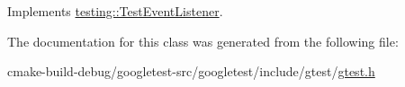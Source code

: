 Implements \mbox{\hyperlink{classtesting_1_1TestEventListener_ab4f6a0ca16ae75daf385b3b5914e1048}{testing\+::\+Test\+Event\+Listener}}.



The documentation for this class was generated from the following file\+:\begin{DoxyCompactItemize}
\item 
cmake-\/build-\/debug/googletest-\/src/googletest/include/gtest/\mbox{\hyperlink{gtest_8h}{gtest.\+h}}\end{DoxyCompactItemize}
